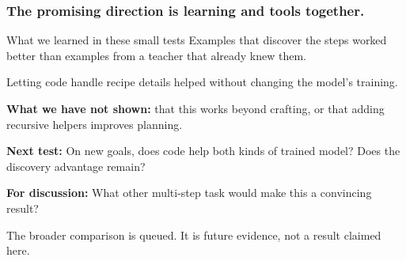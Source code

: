 \documentclass[aspectratio=169,12pt]{beamer}
\newcommand{\aside}[1]{\vfill{\footnotesize\color{Gray}#1\par}}
\begin{document}
\begin{frame}[t]
\frametitle{The promising direction is learning and tools together.}
\begin{block}{What we learned in these small tests}
Examples that discover the steps worked better than examples from a teacher that already knew them.\par
\medskip
Letting code handle recipe details helped without changing the model's training.
\end{block}
\textbf{What we have not shown:} that this works beyond crafting, or that adding recursive helpers improves planning.
\medskip

\textbf{Next test:} On new goals, does code help both kinds of trained model? Does the discovery advantage remain?
\medskip

\textbf{For discussion:} What other multi-step task would make this a convincing result?
\aside{The broader comparison is queued. It is future evidence, not a result claimed here.}
\end{frame}
\end{document}
